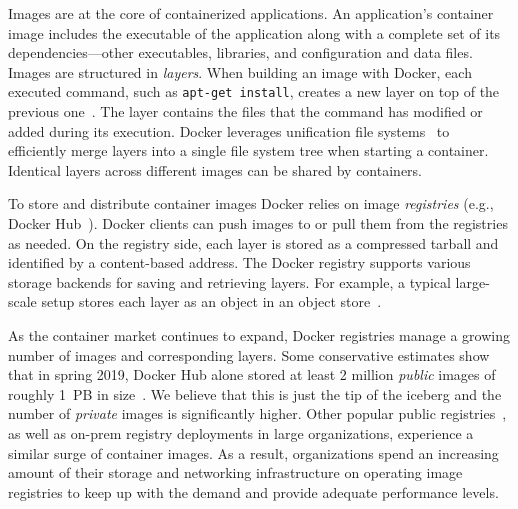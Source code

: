 Images are at the core of containerized applications.
%
An application's container image includes the executable of the application
along with a complete set of its dependencies---other executables, libraries, and
configuration and data files.
%
Images are structured in \emph{layers}. When building an image with Docker, each
executed command, such as \texttt{apt-get install}, creates a new layer on
top of the previous one~\cite{dockerfile}.
%
The layer contains the files that the command has modified or added during its
execution.
%
%
Docker leverages unification file systems~\cite{docker-driver-eval} to
efficiently merge layers into a single file system tree when starting a container.
%
Identical layers across different images can be shared by containers.

To store and distribute container images Docker relies on image
\emph{registries} (e.g., Docker Hub~\cite{docker-hub}).
%
Docker clients can push images to or pull them from the registries as needed.
%
On the registry side, each layer is stored as a compressed tarball and
identified by a content-based address.
%
The Docker registry supports various storage backends for saving and retrieving
layers. For example, a typical large-scale setup stores each layer as an object in an
object store~\cite{s3,swift}.

As the container market continues to expand, Docker registries manage a
growing number of images and corresponding layers.
%
Some conservative estimates show that in spring 2019, Docker Hub alone
stored at least 2 million \emph{public} images of roughly 1~PB in
size~\cite{skourtis2019carving,dedupanalysis}. 
%
We believe that this is just the tip of the iceberg and the number of
\emph{private} images is significantly higher.
%
Other popular public
registries~\cite{amazon-ecr,jfrog-artifactory,azure-cr,google-cr}, as well as
on-prem registry deployments in large organizations, experience a similar
surge of container images.
%
As a result,
organizations spend an increasing amount of their storage and networking
infrastructure on operating image registries
to keep up with the demand and provide adequate performance levels.
%
%

